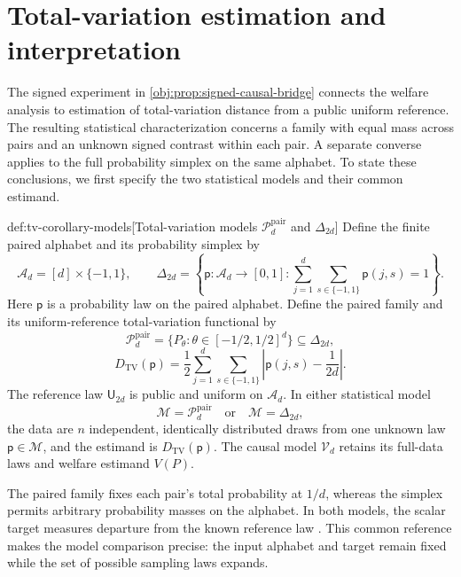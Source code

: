 \section{Total-variation estimation and interpretation}

The signed experiment in \cref{obj:prop:signed-causal-bridge} connects the welfare analysis to estimation of total-variation distance from a public uniform reference. The resulting statistical characterization concerns a family with equal mass across pairs and an unknown signed contrast within each pair. A separate converse applies to the full probability simplex on the same alphabet. To state these conclusions, we first specify the two statistical models and their common estimand.

\begin{definitionv}{def:tv-corollary-models}[Total-variation models $\mathcal P_d^{\mathrm{pair}}$ and $\Delta_{2d}$]
Define the finite paired alphabet and its probability simplex by
\[
\mathcal A_d=[d]\times\{-1,1\},
\qquad
\Delta_{2d}
=
\left\{
\mathsf p:\mathcal A_d\to[0,1]:
\sum_{j=1}^d\sum_{s\in\{-1,1\}}\mathsf p(j,s)=1
\right\}.
\]
Here \(\mathsf p\) is a probability law on the paired alphabet. Define the paired family and its uniform-reference total-variation functional by
\[
\mathcal P_d^{\mathrm{pair}}
=
\{P_\theta:\theta\in[-1/2,1/2]^d\}
\subseteq\Delta_{2d},
\]
\[
D_{\mathrm{TV}}(\mathsf p)
=
\frac12\sum_{j=1}^d\sum_{s\in\{-1,1\}}
\left|\mathsf p(j,s)-\frac1{2d}\right|.
\]
The reference law \(\mathsf U_{2d}\) is public and uniform on \(\mathcal A_d\). In either statistical model
\[
\mathcal M=\mathcal P_d^{\mathrm{pair}}
\quad\text{or}\quad
\mathcal M=\Delta_{2d},
\]
the data are \(n\) independent, identically distributed draws from one unknown law \(\mathsf p\in\mathcal M\), and the estimand is \(D_{\mathrm{TV}}(\mathsf p)\). The causal model \(\mathcal V_d\) retains its full-data laws and welfare estimand \(V(P)\).
\end{definitionv}

The paired family  fixes each pair's total probability at \(1/d\), whereas the simplex  permits arbitrary probability masses on the alphabet. In both models, the scalar target  measures departure from the known reference law . This common reference makes the model comparison precise: the input alphabet and target remain fixed while the set of possible sampling laws expands.


